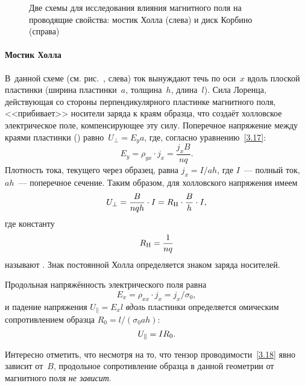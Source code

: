 \begin{figure}[h!]
\centering
    \caption{Две схемы для исследования влияния магнитного поля на
проводящие свойства: мостик Холла (слева) и диск Корбино (справа)}
\end{figure}

\paragraph{Мостик Холла}
В~данной схеме (см. рис.~, слева) ток вынуждают течь по
оси~$x$ вдоль плоской пластинки (ширина пластинки~$a$, толщина~$h$,
длина~$l$).
Сила Лоренца, действующая со стороны перпендикулярного
пластинке магнитного поля, <<прибивает>> носители заряда к краям образца,
что создаёт холловское электрическое поле, компенсирующее эту силу.
Поперечное напряжение между краями пластинки
() равно~$U_{\perp}=E_ya$,
где, согласно уравнению~\eqref{3.17}:
\[
E_y=\rho_{yx}\cdot j_x=\frac{j_x B}{nq}.
\]
Плотность тока, текущего через образец, равна $j_x=I/ah$, где $I$~---
полный ток, $ah$~--- поперечное сечение.
Таким образом, для холловского напряжения имеем
\begin{equation}
    U_{\perp}=\frac{B}{nqh}\cdot I =R_{\rm H}\cdot \frac{B}{h}\cdot I,
    \eqmark{3.19}
\end{equation}
где константу
\begin{equation}
    R_{\rm H}= \frac{1}{nq}
    \eqmark{HallConstant}
\end{equation}
называют . 
Знак постоянной Холла определяется знаком заряда носителей.

Продольная напряжённость электрического поля равна
\[E_x = \rho_{xx}\cdot j_x = j_x/\sigma_0,\]
и падение напряжения $U_{\parallel}=E_x l$ \emph{вдоль} пластинки 
определяется омическим сопротивлением образца 
 $R_0 = l/(\sigma_0ah)$:
\begin{equation}
    U_{\parallel}= I R_0.
    \eqmark{3.20}
\end{equation}

Интересно отметить, что несмотря на то, что тензор проводимости~\eqref{3.18}
явно зависит от~$B$, продольное сопротивление образца 
в данной геометрии от магнитного поля \emph{не зависит}.

